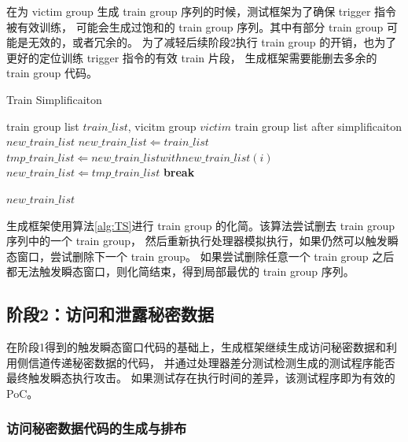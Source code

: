 在为 victim group 生成 train group 序列的时候，测试框架为了确保 trigger 指令被有效训练，
可能会生成过饱和的 train group 序列。其中有部分 train group 可能是无效的，或者冗余的。
为了减轻后续阶段2执行 train group 的开销，也为了更好的定位训练 trigger 指令的有效 train 片段，
生成框架需要能删去多余的 train group 代码。\par

\begin{algorithm}[!h]
    
    
    \caption{Train Simplificaiton}
    \label{alg:TS}
    \renewcommand{\algorithmicrequire}{\textbf{Input:}}
    \renewcommand{\algorithmicensure}{\textbf{Output:}}
    
    \begin{algorithmic}[1]
        \REQUIRE train group list $train\_list$, vicitm group $victim$  %
        \ENSURE train group list after simplificaiton $new\_train\_list$    %
        \STATE $new\_train\_list \Leftarrow train\_list$
                \STATE $tmp\_train\_list \Leftarrow new\_train\_list with new\_train\_list(i)$
                    \STATE $new\_train\_list \Leftarrow tmp\_train\_list$
                    \STATE \textbf{break}
                \ENDIF
            \ENDFOR
        \ENDFOR

        \RETURN $new\_train\_list$
    \end{algorithmic}
\end{algorithm}

生成框架使用算法\ref{alg:TS}进行 train group 的化简。该算法尝试删去 train group 序列中的一个 train group，
然后重新执行处理器模拟执行，如果仍然可以触发瞬态窗口，尝试删除下一个 train group。
如果尝试删除任意一个 train group 之后都无法触发瞬态窗口，则化简结束，得到局部最优的 train group 序列。\par

\subsection{阶段2：访问和泄露秘密数据}

在阶段1得到的触发瞬态窗口代码的基础上，生成框架继续生成访问秘密数据和利用侧信道传递秘密数据的代码，
并通过处理器差分测试检测生成的测试程序能否最终触发瞬态执行攻击。
如果测试存在执行时间的差异，该测试程序即为有效的 PoC。

\subsubsection{访问秘密数据代码的生成与排布}

